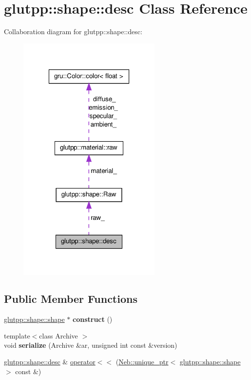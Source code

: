 \hypertarget{classglutpp_1_1shape_1_1desc}{\section{glutpp\-:\-:shape\-:\-:desc \-Class \-Reference}
\label{classglutpp_1_1shape_1_1desc}
}


\-Collaboration diagram for glutpp\-:\-:shape\-:\-:desc\-:
\nopagebreak
\begin{figure}[H]
\begin{center}
\leavevmode
\includegraphics[width=202pt]{classglutpp_1_1shape_1_1desc__coll__graph}
\end{center}
\end{figure}
\subsection*{\-Public \-Member \-Functions}
\begin{DoxyCompactItemize}
\item 
\hypertarget{classglutpp_1_1shape_1_1desc_af36dd71962f6a94dded41e5f2edf88f3}{\hyperlink{classglutpp_1_1shape_1_1shape}{glutpp\-::shape\-::shape} $\ast$ {\bfseries construct} ()}\label{classglutpp_1_1shape_1_1desc_af36dd71962f6a94dded41e5f2edf88f3}

\item 
\hypertarget{classglutpp_1_1shape_1_1desc_a1f9c214768dcae2d45b70d1e930a8381}{{\footnotesize template$<$class Archive $>$ }\\void {\bfseries serialize} (\-Archive \&ar, unsigned int const \&version)}\label{classglutpp_1_1shape_1_1desc_a1f9c214768dcae2d45b70d1e930a8381}

\item 
\hyperlink{classglutpp_1_1shape_1_1desc}{glutpp\-::shape\-::desc} \& \hyperlink{classglutpp_1_1shape_1_1desc_ac128de74ae06c2d4064e87bf638aa5e6}{operator$<$$<$} (\hyperlink{classNeb_1_1unique__ptr}{\-Neb\-::unique\-\_\-ptr}$<$ \hyperlink{classglutpp_1_1shape_1_1shape}{glutpp\-::shape\-::shape} $>$ const \&)
\end{DoxyCompactItemize}
